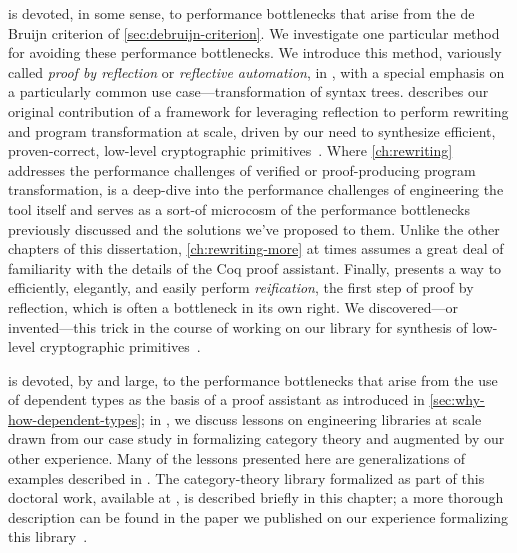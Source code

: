  is devoted, in some sense, to performance bottlenecks that arise from the de Bruijn criterion of \autoref{sec:debruijn-criterion}.
We investigate one particular method for avoiding these performance bottlenecks.
We introduce this method, variously called \emph{proof by reflection} or \emph{reflective automation}, in , with a special emphasis on a particularly common use case---transformation of syntax trees.
 describes our original contribution of a framework for leveraging reflection to perform rewriting and program transformation at scale, driven by our need to synthesize efficient, proven-correct, low-level cryptographic primitives~\cite{FiatCryptoSP19}.
%
Where \autoref{ch:rewriting} addresses the performance challenges of verified or proof-producing program transformation,  is a deep-dive into the performance challenges of engineering the tool itself and serves as a sort-of microcosm of the performance bottlenecks previously discussed and the solutions we've proposed to them.
Unlike the other chapters of this dissertation, \autoref{ch:rewriting-more} at times assumes a great deal of familiarity with the details of the Coq proof assistant.
Finally,  presents a way to efficiently, elegantly, and easily perform \emph{reification}, the first step of proof by reflection, which is often a bottleneck in its own right.
We discovered---or invented---this trick in the course of working on our library for synthesis of low-level cryptographic primitives~\cite{FiatCryptoSP19,reification-by-parametricity}.

 is devoted, by and large, to the performance bottlenecks that arise from the use of dependent types as the basis of a proof assistant as introduced in \autoref{sec:why-how-dependent-types};
in , we discuss lessons on engineering libraries at scale drawn from our case study in formalizing category theory %
and augmented by our other experience.
Many of the lessons presented here are generalizations of examples described in .
The category-theory library formalized as part of this doctoral work, available at \textcite{HoTT/HoTT-categories}, is described briefly in this chapter; a more thorough description can be found in the paper we published on our experience formalizing this library~\cite{category-coq-experience}.

